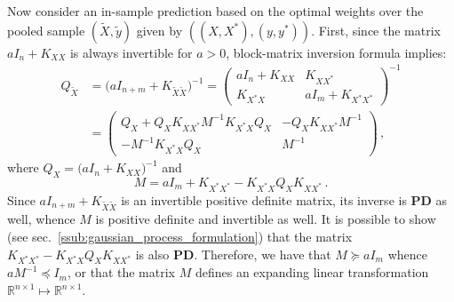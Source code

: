 \documentclass[a4paper,14pt]{article}
\newcommand{\Real}{\mathbb{R}}
\begin{document}
Now consider an in-sample prediction based on the optimal weights over the pooled
sample $(\tilde{X}, \tilde{y})$ given by $((X, X^*), (y, y^*))$. First, since the
matrix $a I_n + K_{XX}$ is always invertible for $a > 0$, block-matrix inversion
formula implies:
\begin{align*}
  Q_{\tilde{X}}
    &= \bigl( a I_{n+m} + K_{\tilde{X}\tilde{X}} \bigr)^{-1}
    = \begin{pmatrix}
      a I_n + K_{XX} & K_{XX^*} \\
      K_{X^*X} & a I_m + K_{X^*X^*}
    \end{pmatrix}^{-1} \\
    &= \begin{pmatrix}
      Q_X + Q_X K_{XX^*} M^{-1} K_{X^*X} Q_X & - Q_X K_{XX^*} M^{-1} \\
      - M^{-1} K_{X^*X} Q_X & M^{-1}
    \end{pmatrix}
    \,,
\end{align*}
where $Q_X = \bigl( a I_n + K_{XX} \bigr)^{-1}$ and
$$ M = aI_m + K_{X^*X^*} - K_{X^*X} Q_X K_{XX^*} \,. $$
Since $a I_{n+m} + K_{\tilde{X}\tilde{X}}$ is an invertible positive definite matrix,
its inverse is \textbf{PD} as well, whence $M$ is positive definite and invertible
as well. It is possible to show (see sec.~\ref{ssub:gaussian_process_formulation})
that the matrix $K_{X^*X^*} - K_{X^*X} Q_X K_{XX^*}$ is also \textbf{PD}. Therefore,
we have that $M \succeq a I_m$ whence $a M^{-1} \preceq I_m$, or that the matrix $M$
defines an expanding linear transformation $\Real^{n\times 1} \mapsto \Real^{n\times 1}$.
\end{document}
